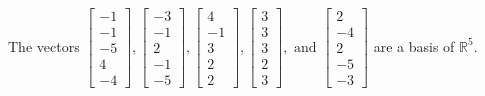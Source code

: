 \begin{exercise}
\begin{exerciseStatement}
  \end{exerciseStatement}
  \begin{exerciseAnswer}
   The vectors \(\left[\begin{array}{r}
-1 \\
-1 \\
-5 \\
4 \\
-4
\end{array}\right] , \left[\begin{array}{r}
-3 \\
-1 \\
2 \\
-1 \\
-5
\end{array}\right] , \left[\begin{array}{r}
4 \\
-1 \\
3 \\
2 \\
2
\end{array}\right] , \left[\begin{array}{r}
3 \\
3 \\
3 \\
2 \\
3
\end{array}\right] , \text{ and } \left[\begin{array}{r}
2 \\
-4 \\
2 \\
-5 \\
-3
\end{array}\right]\) 
  	 are  a basis of \(\mathbb{R}^5\).
  


  \end{exerciseAnswer}
\end{exercise}